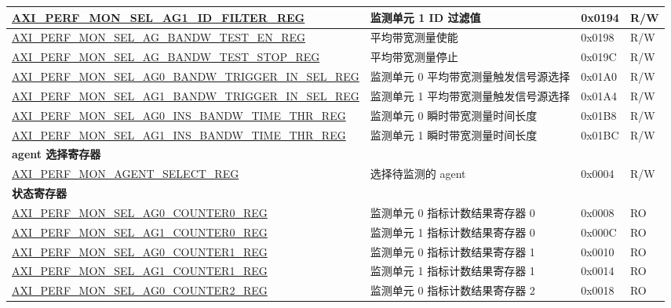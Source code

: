 \begin{longtable}{ | p{9.1cm} | p{5cm} | p{1.3cm} | p{1.3cm} | }
\hyperref[regdesc:AXIPERFMONSELAGNIDFILTERREG]{AXI\_PERF\_MON\_SEL\_AG1\_ID\_FILTER\_REG} & 监测单元 1 ID 过滤值 & 0x0194 & R/W\\ \hline
\hyperref[regdesc:AXIPERFMONSELAGBANDWTESTENREG]{AXI\_PERF\_MON\_SEL\_AG\_BANDW\_TEST\_EN\_REG} & 平均带宽测量使能 & 0x0198 & R/W\\ \hline
\hyperref[regdesc:AXIPERFMONSELAGBANDWTESTSTOPREG]{AXI\_PERF\_MON\_SEL\_AG\_BANDW\_TEST\_STOP\_REG} & 平均带宽测量停止 & 0x019C & R/W\\ \hline
\hyperref[regdesc:AXIPERFMONSELAGNBANDWTRIGGERINSELREG]{AXI\_PERF\_MON\_SEL\_AG0\_BANDW\_TRIGGER\_IN\_SEL\_REG} & 监测单元 0 平均带宽测量触发信号源选择 & 0x01A0 & R/W\\ \hline
\hyperref[regdesc:AXIPERFMONSELAGNBANDWTRIGGERINSELREG]{AXI\_PERF\_MON\_SEL\_AG1\_BANDW\_TRIGGER\_IN\_SEL\_REG} & 监测单元 1 平均带宽测量触发信号源选择 & 0x01A4 & R/W\\ \hline
\hyperref[regdesc:AXIPERFMONSELAGNINSBANDWTIMETHRREG]{AXI\_PERF\_MON\_SEL\_AG0\_INS\_BANDW\_TIME\_THR\_REG} & 监测单元 0 瞬时带宽测量时间长度 & 0x01B8 & R/W\\ \hline
\hyperref[regdesc:AXIPERFMONSELAGNINSBANDWTIMETHRREG]{AXI\_PERF\_MON\_SEL\_AG1\_INS\_BANDW\_TIME\_THR\_REG} & 监测单元 1 瞬时带宽测量时间长度 & 0x01BC & R/W\\ \hline
\multicolumn{4}{|l|}{\textbf{agent 选择寄存器}} \\ \hline
\hyperref[regdesc:AXIPERFMONAGENTSELECTREG]{AXI\_PERF\_MON\_AGENT\_SELECT\_REG} & 选择待监测的 agent & 0x0004 & R/W\\ \hline
\multicolumn{4}{|l|}{\textbf{状态寄存器}} \\ \hline
\hyperref[regdesc:AXIPERFMONSELAGNCOUNTERMREG]{AXI\_PERF\_MON\_SEL\_AG0\_COUNTER0\_REG} & 监测单元 0 指标计数结果寄存器 0 & 0x0008 & RO\\ \hline
\hyperref[regdesc:AXIPERFMONSELAGNCOUNTERMREG]{AXI\_PERF\_MON\_SEL\_AG1\_COUNTER0\_REG} & 监测单元 1 指标计数结果寄存器 0 & 0x000C & RO\\ \hline
\hyperref[regdesc:AXIPERFMONSELAGNCOUNTERMREG]{AXI\_PERF\_MON\_SEL\_AG0\_COUNTER1\_REG} & 监测单元 0 指标计数结果寄存器 1 & 0x0010 & RO\\ \hline
\hyperref[regdesc:AXIPERFMONSELAGNCOUNTERMREG]{AXI\_PERF\_MON\_SEL\_AG1\_COUNTER1\_REG} & 监测单元 1 指标计数结果寄存器 1 & 0x0014 & RO\\ \hline
\hyperref[regdesc:AXIPERFMONSELAGNCOUNTERMREG]{AXI\_PERF\_MON\_SEL\_AG0\_COUNTER2\_REG} & 监测单元 0 指标计数结果寄存器 2 & 0x0018 & RO\\ \hline

\end{longtable}

